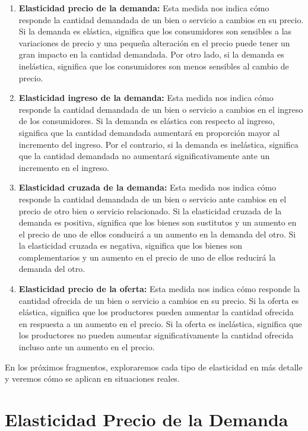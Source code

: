 \documentclass[
  a4paper,
]{article}
\begin{document}
\begin{enumerate}
\def\labelenumi{\arabic{enumi}.}
\item
  \textbf{Elasticidad precio de la demanda:} Esta medida nos indica cómo
  responde la cantidad demandada de un bien o servicio a cambios en su
  precio. Si la demanda es elástica, significa que los consumidores son
  sensibles a las variaciones de precio y una pequeña alteración en el
  precio puede tener un gran impacto en la cantidad demandada. Por otro
  lado, si la demanda es inelástica, significa que los consumidores son
  menos sensibles al cambio de precio.
\item
  \textbf{Elasticidad ingreso de la demanda:} Esta medida nos indica
  cómo responde la cantidad demandada de un bien o servicio a cambios en
  el ingreso de los consumidores. Si la demanda es elástica con respecto
  al ingreso, significa que la cantidad demandada aumentará en
  proporción mayor al incremento del ingreso. Por el contrario, si la
  demanda es inelástica, significa que la cantidad demandada no
  aumentará significativamente ante un incremento en el ingreso.
\item
  \textbf{Elasticidad cruzada de la demanda:} Esta medida nos indica
  cómo responde la cantidad demandada de un bien o servicio ante cambios
  en el precio de otro bien o servicio relacionado. Si la elasticidad
  cruzada de la demanda es positiva, significa que los bienes son
  sustitutos y un aumento en el precio de uno de ellos conducirá a un
  aumento en la demanda del otro. Si la elasticidad cruzada es negativa,
  significa que los bienes son complementarios y un aumento en el precio
  de uno de ellos reducirá la demanda del otro.
\item
  \textbf{Elasticidad precio de la oferta:} Esta medida nos indica cómo
  responde la cantidad ofrecida de un bien o servicio a cambios en su
  precio. Si la oferta es elástica, significa que los productores pueden
  aumentar la cantidad ofrecida en respuesta a un aumento en el precio.
  Si la oferta es inelástica, significa que los productores no pueden
  aumentar significativamente la cantidad ofrecida incluso ante un
  aumento en el precio.
\end{enumerate}

En los próximos fragmentos, exploraremos cada tipo de elasticidad en más
detalle y veremos cómo se aplican en situaciones reales.

\hypertarget{elasticidad-precio-de-la-demanda}{%
\section{Elasticidad Precio de la
Demanda}\label{elasticidad-precio-de-la-demanda}}
\end{document}
